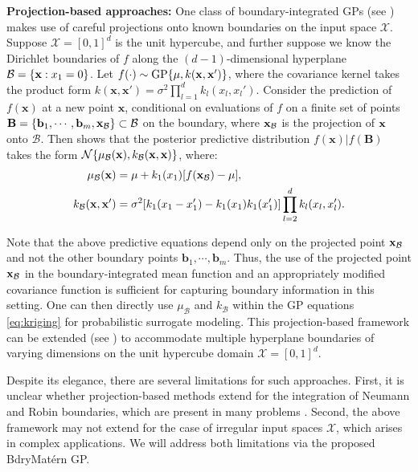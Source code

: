 \documentclass[aos,preprint]{imsart}
\theoremstyle{plain}
\newcommand{\Bx}{\bold x}
\theoremstyle{remark}
\begin{document}
\textbf{Projection-based approaches:} One class of boundary-integrated GPs (see \cite{vernon2019known,jackson2023efficient}) makes use of careful projections onto known boundaries on the input space $\mathcal{X}$. Suppose $\mathcal{X} = [0,1]^d$ is the unit hypercube, and further suppose we know the Dirichlet boundaries of $f$ along the $(d-1)$-dimensional hyperplane $\mathcal{B} = \{\Bx: x_1 = 0\}$. Let $f(\cdot) \sim \text{GP}\{\mu,k(\Bx,\Bx')\}$, where the covariance kernel takes the product form $k(\mathbf{x},\mathbf{x}') = \sigma^2 \prod_{l=1}^d k_l(x_l,x_l')$. Consider the prediction of $f(\mathbf{x})$ at a new point $\mathbf{x}$, conditional on evaluations of $f$ on a finite set of points $\mathbf{B} = \{\mathbf{b}_1, \cdots, \mathbf{b}_m,\Bx_{\mathcal{B}}\} \subset \mathcal{B}$ on the boundary, where $\Bx_{\mathcal{B}}$ is the projection of $\Bx$ onto $\mathcal{B}$. Then \cite{vernon2019known} shows that the posterior predictive distribution $f(\mathbf{x})|f(\mathbf{B})$ takes the form $\mathcal{N}\{\mu_{\mathcal{B}}(\mathbf{x}),k_{\mathcal{B}}(\Bx,\Bx)\}$, where:
\begin{align}
\begin{split}
\mu_{\mathcal{B}}(\mathbf{x}) &= \mu + k_1(x_1)[f(\Bx_{\mathcal{B}}) - \mu],\\
k_{\mathcal{B}}(\Bx,\Bx')&= \sigma^2 [k_1(x_1-x_1')-k_1(x_1)k_1(x_1')] \prod_{l=2}^d k_l(x_l,x_l').
\label{eq:proj}
\end{split}
\end{align}

Note that the above predictive equations depend only on the projected point $\Bx_{\mathcal{B}}$ and not the other boundary points $\mathbf{b}_1, \cdots, \mathbf{b}_m$. Thus, the use of the projected point $\Bx_{\mathcal{B}}$ in the boundary-integrated mean function and an appropriately modified covariance function is sufficient for capturing boundary information in this setting. One can then directly use $\mu_{\mathcal{B}}$ and $k_{\mathcal{B}}$ within the GP equations \eqref{eq:kriging} for probabilistic surrogate modeling. This projection-based framework can be extended (see \cite{jackson2023efficient}) to accommodate multiple hyperplane boundaries of varying dimensions on the unit hypercube domain $\mathcal{X} = [0,1]^d$.

Despite its elegance, there are several limitations for such approaches. First, it is unclear whether projection-based methods extend for the integration of Neumann and Robin boundaries, which are present in many problems \citep{dalton2024boundary}. Second, the above framework may not extend for the case of irregular input spaces $\mathcal{X}$, which arises in complex applications. We will address both limitations via the proposed BdryMat\'ern GP.
\end{document}
